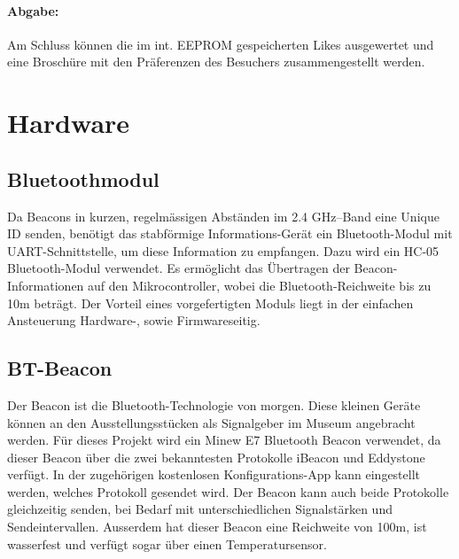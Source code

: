 \paragraph*{Abgabe:}
Am Schluss können die im int. EEPROM gespeicherten Likes ausgewertet und eine Broschüre mit den Präferenzen des Besuchers zusammengestellt werden.
\section{Hardware}
\subsection{Bluetoothmodul}
Da Beacons in kurzen, regelmässigen Abständen im 2.4 GHz–Band eine Unique ID senden, benötigt das stabförmige Informations-Gerät ein Bluetooth-Modul mit UART-Schnittstelle, um diese Information zu empfangen. Dazu wird ein HC-05 Bluetooth-Modul verwendet. Es ermöglicht das Übertragen der Beacon-Informationen auf den Mikrocontroller, wobei die Bluetooth-Reichweite bis zu 10m beträgt. Der Vorteil eines vorgefertigten Moduls liegt in der einfachen Ansteuerung Hardware-, sowie Firmwareseitig.

\subsection{BT-Beacon}
Der Beacon ist die Bluetooth-Technologie von morgen. Diese kleinen Geräte können an den Ausstellungsstücken als Signalgeber im Museum angebracht werden. Für dieses Projekt wird ein Minew E7 Bluetooth Beacon verwendet, da dieser Beacon über die zwei bekanntesten Protokolle iBeacon und Eddystone verfügt. In der zugehörigen kostenlosen Konfigurations-App kann eingestellt werden, welches Protokoll gesendet wird. Der Beacon kann auch beide Protokolle gleichzeitig senden, bei Bedarf mit unterschiedlichen Signalstärken und Sendeintervallen. Ausserdem hat dieser Beacon eine Reichweite von 100m, ist wasserfest und verfügt sogar über einen Temperatursensor.

